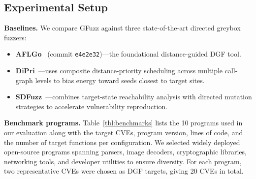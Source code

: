 \documentclass[preprint,12pt,3p]{elsarticle}
\begin{document}
\subsection{Experimental Setup}

\textbf{Baselines.}  We compare GFuzz against three state-of-the-art directed
greybox fuzzers:
\begin{itemize}
  \item \textbf{AFLGo}~\cite{bohme2017directed} (commit \texttt{e4e2e32})---the
    foundational distance-guided DGF tool.
  \item \textbf{DiPri}~\cite{dipri2023}---uses composite distance-priority
    scheduling across multiple call-graph levels to bias energy toward seeds
    closest to target sites.
  \item \textbf{SDFuzz}~\cite{sdfuzz2023}---combines target-state reachability
    analysis with directed mutation strategies to accelerate vulnerability
    reproduction.
\end{itemize}

\textbf{Benchmark programs.}  Table~\ref{tbl:benchmarks} lists the 10
programs used in our evaluation along with the target CVEs, program version,
lines of code, and the number of target functions per configuration.  We
selected widely deployed open-source programs spanning parsers, image
decoders, cryptographic libraries, networking tools, and developer utilities
to ensure diversity.  For each program, two representative CVEs were chosen
as DGF targets, giving 20 CVEs in total.
\end{document}
